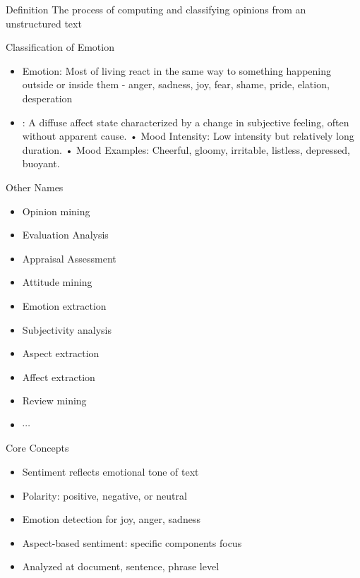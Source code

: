 

\begin{frame}{Definition}
\Huge
The process of computing and classifying opinions from an unstructured text

\end{frame}

\begin{frame}{Classification of Emotion}
\begin{itemize}
\item Emotion: Most of living  react in the same way to something happening outside or inside them -  anger, sadness, joy, fear, shame,
pride, elation, desperation
\item {}: A diffuse affect state characterized by a change in subjective feeling, often without apparent cause.
	•	Mood Intensity: Low intensity but relatively long duration.
	•	Mood Examples: Cheerful, gloomy, irritable, listless, depressed, buoyant.
\end{itemize}
\end{frame}
\begin{frame}{Other Names}
\begin{itemize}
\item Opinion mining
\item Evaluation Analysis
\item Appraisal Assessment
\item Attitude mining
\item Emotion extraction
\item Subjectivity analysis
\item Aspect extraction
\item Affect extraction
\item Review mining
\item $\cdots$
\end{itemize}
\end{frame}
\begin{frame}{Core Concepts}
    \begin{itemize}
        \item Sentiment reflects emotional tone of text
        \item Polarity: positive, negative, or neutral
        \item Emotion detection for joy, anger, sadness
        \item Aspect-based sentiment: specific components focus
        \item Analyzed at document, sentence, phrase level
    \end{itemize}
\end{frame}

